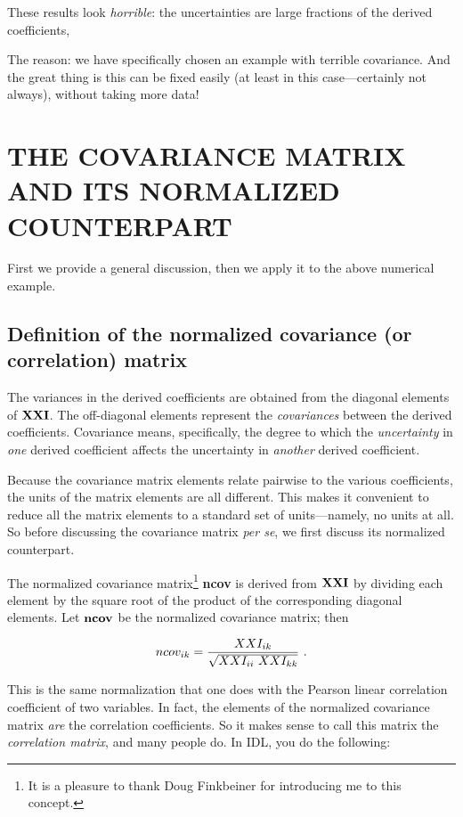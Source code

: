 \documentclass[psfig,preprint]{aastex}
\begin{document}
\noindent These results look {\it horrible}: the uncertainties are large
fractions of the derived coefficients, 

	The reason: we have specifically chosen an example with terrible
covariance. And the great thing is this can be fixed easily (at least in
this case---certainly not always), without taking more data! 

\section{THE COVARIANCE MATRIX AND ITS NORMALIZED COUNTERPART} 
\label{ncov}

	First we provide a general discussion, then we apply it to the
above numerical example.

\subsection{ Definition of the normalized covariance (or correlation) matrix}

	The variances in the derived coefficients are obtained from the
diagonal elements of ${\bf XXI}$. The off-diagonal elements represent
the {\it covariances} between the derived coefficients. Covariance
means, specifically, the degree to which the {\it uncertainty} in {\it
one} derived coefficient affects the uncertainty in {\it another}
derived coefficient. 

	Because the covariance matrix elements relate pairwise to the
various coefficients, the units of the matrix elements are all
different. This makes it convenient to reduce all the matrix elements to
a standard set of units---namely, no units at all. So before discussing
the covariance matrix {\it per se}, we first discuss its normalized
counterpart. 

	The normalized covariance
matrix\footnote{It is a pleasure to thank Doug Finkbeiner for
introducing me to this concept.} {\bf ncov} is derived from ${\bf XXI}$
by dividing each element by the square root of the product of the
corresponding diagonal elements. Let ${\bf ncov}$ be the normalized
covariance matrix; then

\begin{equation}
ncov_{ik} = {XXI_{ik} \over \sqrt {XXI_{ii} \ XXI_{kk}}} \ .
\end{equation}

\noindent This is the same normalization that one does with the Pearson
linear correlation coefficient of two variables.  In fact, the elements
of the normalized covariance matrix {\it are} the correlation
coefficients.  So it makes sense to call this matrix the {\it
correlation matrix}, and many people do. In IDL, you do the following:
 
\end{document}
